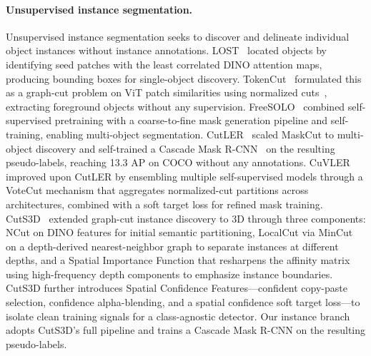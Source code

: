 \documentclass[10pt,twocolumn,letterpaper]{article}
\begin{document}
\paragraph{Unsupervised instance segmentation.}
Unsupervised instance segmentation seeks to discover and delineate individual object instances without instance annotations. LOST~\cite{simeoni2021lost} located objects by identifying seed patches with the least correlated DINO attention maps, producing bounding boxes for single-object discovery. TokenCut~\cite{wang2022tokencut} formulated this as a graph-cut problem on ViT patch similarities using normalized cuts~\cite{shi2000ncut}, extracting foreground objects without any supervision. FreeSOLO~\cite{wang2022freesolo} combined self-supervised pretraining with a coarse-to-fine mask generation pipeline and self-training, enabling multi-object segmentation. CutLER~\cite{wang2023cutler} scaled MaskCut to multi-object discovery and self-trained a Cascade Mask R-CNN~\cite{cai2019cascade} on the resulting pseudo-labels, reaching 13.3 AP on COCO without any annotations. CuVLER~\cite{arica2024cuvler} improved upon CutLER by ensembling multiple self-supervised models through a VoteCut mechanism that aggregates normalized-cut partitions across architectures, combined with a soft target loss for refined mask training. CutS3D~\cite{sick2025cuts3d} extended graph-cut instance discovery to 3D through three components: NCut on DINO features for initial semantic partitioning, LocalCut via MinCut on a depth-derived nearest-neighbor graph to separate instances at different depths, and a Spatial Importance Function that resharpens the affinity matrix using high-frequency depth components to emphasize instance boundaries. CutS3D further introduces Spatial Confidence Features---confident copy-paste selection, confidence alpha-blending, and a spatial confidence soft target loss---to isolate clean training signals for a class-agnostic detector. Our instance branch adopts CutS3D's full pipeline and trains a Cascade Mask R-CNN on the resulting pseudo-labels.
\end{document}
